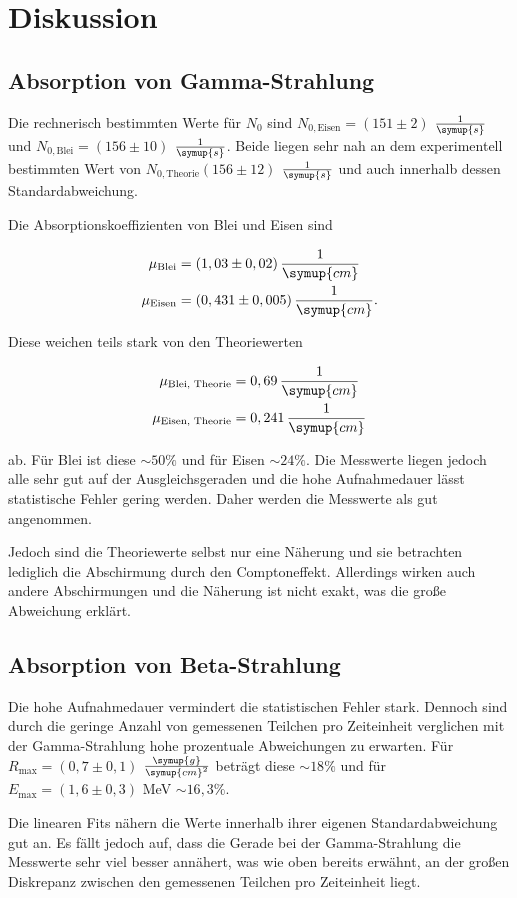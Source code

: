 \section{Diskussion}
\label{sec:Diskussion}

\subsection{Absorption von Gamma-Strahlung}

Die rechnerisch bestimmten Werte für $N_0$ sind $N_{0,\text{Eisen}} = (151 \pm 2)$ $\frac{1}{\symup{s}}$ und $N_{0,\text{Blei}} = (156 \pm 10)$ $\frac{1}{\symup{s}}$. 
Beide liegen sehr nah an dem experimentell bestimmten Wert von $N_{0,\text{Theorie}} (156 \pm 12)$ $\frac{1}{\symup{s}}$ und auch innerhalb dessen Standardabweichung.

Die Absorptionskoeffizienten von Blei und Eisen sind

\begin{align*}
    \mu_\text{Blei} &= (1,03 \pm 0,02) \, \frac{1}{\symup{cm}}\\
    \mu_\text{Eisen} &= (0,431 \pm 0,005) \, \frac{1}{\symup{cm}}.
\end{align*}

Diese weichen teils stark von den Theoriewerten

\begin{align*}
    \mu_\text{Blei, Theorie} &= 0,69 \, \frac{1}{\symup{cm}}\\
    \mu_\text{Eisen, Theorie} &= 0,241 \, \frac{1}{\symup{cm}}
\end{align*}

ab. Für Blei ist diese $\sim \! 50\%$ und für Eisen $\sim \! 24\%$.
Die Messwerte liegen jedoch alle sehr gut auf der Ausgleichsgeraden und die hohe Aufnahmedauer lässt statistische Fehler gering werden.
Daher werden die Messwerte als gut angenommen.

Jedoch sind die Theoriewerte selbst nur eine Näherung und sie betrachten lediglich die Abschirmung durch den Comptoneffekt.
Allerdings wirken auch andere Abschirmungen und die Näherung ist nicht exakt, was die große Abweichung erklärt.



\subsection{Absorption von Beta-Strahlung}

Die hohe Aufnahmedauer vermindert die statistischen Fehler stark. Dennoch sind durch die geringe Anzahl von gemessenen Teilchen pro Zeiteinheit
verglichen mit der Gamma-Strahlung hohe prozentuale Abweichungen zu erwarten.
Für $R_\text{max} = (0,7 \pm 0,1)$ $\frac{\symup{g}}{\symup{cm}^2}$ beträgt diese $\sim \! 18 \%$ und für $E_\text{max} = (1,6 \pm 0,3)$ MeV $\sim \! 16,3 \%$.

Die linearen Fits nähern die Werte innerhalb ihrer eigenen Standardabweichung gut an. 
Es fällt jedoch auf, dass die Gerade bei der Gamma-Strahlung die Messwerte sehr viel besser annähert,
was wie oben bereits erwähnt, an der großen Diskrepanz zwischen den gemessenen Teilchen pro Zeiteinheit liegt.